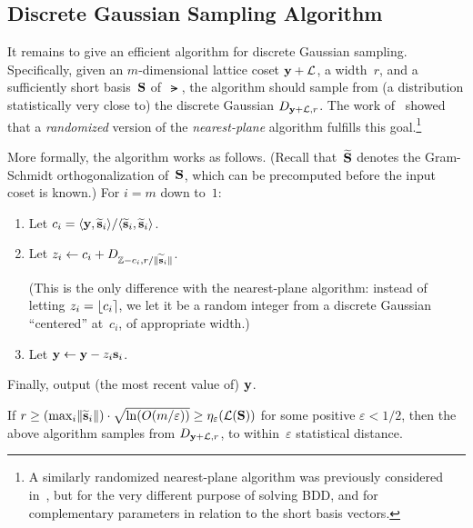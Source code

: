 \documentclass[11pt]{article}
\begin{document}
\subsection{Discrete Gaussian Sampling Algorithm}
\label{sec:dgs-alg}

It remains to give an efficient algorithm for discrete Gaussian
sampling. Specifically, given an $m$-dimensional lattice coset
$\mathbf{y}+\mathcal{L}$, a width~$r$, and a sufficiently short basis~$\mathbf{S}$
of~$\lat$, the algorithm should sample from (a distribution
statistically very close to) the discrete Gaussian $D_{\mathbf{y}+\mathcal{L},r}$.
The work of~\cite{DBLP:conf/stoc/GentryPV08} showed that a
\emph{randomized} version of the \emph{nearest-plane} algorithm
fulfills this goal.\footnote{A similarly randomized nearest-plane
  algorithm was previously considered
  in~\cite{DBLP:conf/soda/Klein00}, but for the very different purpose
  of solving BDD, and for complementary parameters in relation to the
  short basis vectors.}

More formally, the algorithm works as follows. (Recall
that~$\widetilde{\mathbf{S}}$ denotes the Gram-Schmidt orthogonalization
of~$\mathbf{S}$, which can be precomputed before the input coset is known.)
For $i=m$ down to~$1$:
\begin{enumerate}[itemsep=0pt]
\item Let
  $c_i = \langle\mathbf{y}, \widetilde{\mathbf{s}}_i\rangle/\langle\widetilde{\mathbf{s}}_i, \widetilde{\mathbf{s}}_i\rangle$.

\item Let $z_i \gets c_i + D_{\mathbb{Z}-c_i, r/\lVert\widetilde{\mathbf{s}}_i\rVert}$.

  (This is the only difference with the nearest-plane algorithm:
  instead of letting $z_{i} = \lfloor c_{i}\rceil$, we let it be a random
  integer from a discrete Gaussian ``centered'' at~$c_{i}$, of
  appropriate width.)
    
\item Let $\mathbf{y} \gets \mathbf{y} - z_i \mathbf{s}_i$.
\end{enumerate}
Finally, output (the most recent value of) $\mathbf{y}$.

\begin{theorem}
  If
  $r \geq (\max_i \lVert\widetilde{\mathbf{s}}_i\rVert) \cdot
  \sqrt{\ln(O(m/\varepsilon))} \geq \eta_{\varepsilon}(\mathcal{L}(\mathbf{S}))$
  for some positive $\varepsilon < 1/2$, then the above algorithm
  samples from $D_{\mathbf{y}+\mathcal{L},r}$, to within~$\varepsilon$ statistical
  distance.
\end{theorem}
\end{document}
